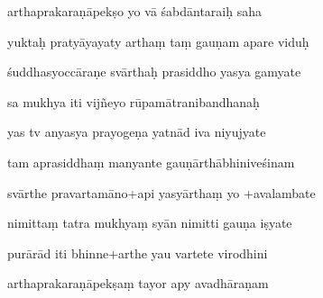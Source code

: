 \documentclass[article,12pt,a4paper]{memoir}%
\newcounter{parCount}
\begin{document}
	  
	  \pstart {} arthaprakaraṇāpekṣo yo vā śabdāntaraiḥ saha 
	{}
	\pend%
      

	  
	  \pstart \leavevmode%
	yuktaḥ pratyāyayaty arthaṃ taṃ gauṇam apare viduḥ 
	{}
	\pend%
      

	  
	  \pstart {} śuddhasyoccāraṇe svārthaḥ prasiddho yasya gamyate 
	{}
	\pend%
      

	  
	  \pstart \leavevmode%
	sa mukhya iti vijñeyo rūpamātranibandhanaḥ 
	{}
	\pend%
      

	  
	  \pstart {} yas tv anyasya prayogeṇa yatnād iva niyujyate 
	{}
	\pend%
      

	  
	  \pstart \leavevmode%
	tam aprasiddhaṃ manyante gauṇārthābhiniveśinam 
	{}
	\pend%
      

	  
	  \pstart {} svārthe pravartamāno+api yasyārthaṃ yo +avalambate 
	{}
	\pend%
      

	  
	  \pstart \leavevmode%
	nimittaṃ tatra mukhyaṃ syān nimitti gauṇa iṣyate 
	{}
	\pend%
      

	  
	  \pstart {} purārād iti bhinne+arthe yau vartete virodhini 
	{}
	\pend%
      

	  
	  \pstart \leavevmode%
	arthaprakaraṇāpekṣaṃ tayor apy avadhāraṇam 
	{}
	\pend%
      
\end{document}
